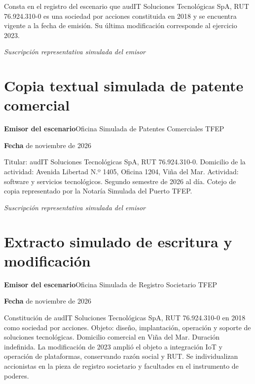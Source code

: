 Consta en el registro del escenario que audIT Soluciones Tecnológicas SpA, RUT 76.924.310-0 es una sociedad por acciones constituida en 2018 y se encuentra vigente a la fecha de emisión. Su última modificación corresponde al ejercicio 2023.

\medskip
\noindent\textit{Suscripción representativa simulada del emisor}\par
\label{adm:vigencia-fin}

\clearpage
\section*{Copia textual simulada de patente comercial}\label{adm:patente}

\rotuloSimuladoSobreUno
\noindent\textbf{Emisor del escenario}\enspace Oficina Simulada de Patentes Comerciales TFEP\par
\noindent\textbf{Fecha} de noviembre de 2026\par
\medskip

Titular: audIT Soluciones Tecnológicas SpA, RUT 76.924.310-0. Domicilio de la actividad: Avenida Libertad N.º 1405, Oficina 1204, Viña del Mar. Actividad: software y servicios tecnológicos. Segundo semestre de 2026 al día. Cotejo de copia representado por la Notaría Simulada del Puerto TFEP.

\medskip
\noindent\textit{Suscripción representativa simulada del emisor}\par
\label{adm:patente-fin}

\clearpage
\section*{Extracto simulado de escritura y modificación}\label{adm:escritura}

\rotuloSimuladoSobreUno
\noindent\textbf{Emisor del escenario}\enspace Oficina Simulada de Registro Societario TFEP\par
\noindent\textbf{Fecha} de noviembre de 2026\par
\medskip

Constitución de audIT Soluciones Tecnológicas SpA, RUT 76.924.310-0 en 2018 como sociedad por acciones. Objeto: diseño, implantación, operación y soporte de soluciones tecnológicas. Domicilio comercial en Viña del Mar. Duración indefinida. La modificación de 2023 amplió el objeto a integración IoT y operación de plataformas, conservando razón social y RUT. Se individualizan accionistas en la pieza de registro societario y facultades en el instrumento de poderes.

